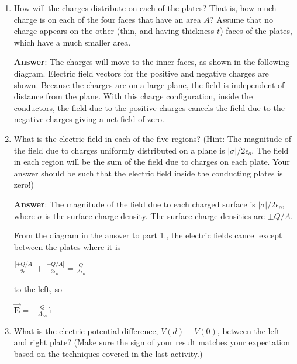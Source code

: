 \documentclass{article}
\newcommand{\ds}[0]{\displaystyle}
\newcommand{\ihat}[0]{\hat{\boldsymbol{\imath}}}
\newcommand{\bfvec}[1]{\vec{\mathbf{#1}}}
\begin{document}
\begin{enumerate}

  \item How will the charges distribute on each of the plates? That is, how much charge is on each of the four faces that have an area $A$? Assume that no charge appears on the other (thin, and having thickness $t$) faces of the plates, which have a much smaller area.

     \ifsolutions
       {\bf Answer}: The charges will move to the inner faces, as shown in the following diagram. Electric field vectors for the positive and negative charges are shown. Because the charges are on a large plane, the field is independent of distance from the plane. With this charge configuration, inside the conductors, the field due to the positive charges cancels the field due to the negative charges giving a net field of zero.

       
     \else
       \vskip 36pt
     \fi
     \ifsolutions\else
     \vskip 36pt
     \fi

  \item What is the electric field in each of the five regions? (Hint: The magnitude of the field due to charges uniformly distributed on a plane is $|\sigma|/2\epsilon_o$. The field in each region will be the sum of the field due to charges on each plate. Your answer should be such that the electric field inside the conducting plates is zero!)

     \ifsolutions
       {\bf Answer}: The magnitude of the field due to each charged surface is $|\sigma|/2\epsilon_o$, where $\sigma$ is the surface charge density. The surface charge densities are $\pm Q/A$.  

       

       From the diagram in the answer to part 1., the electric fields cancel except between the plates where it is 

       $\ds\frac{|+Q/A|}{2\epsilon_o} + \frac{|-Q/A|}{2\epsilon_o} = \frac{Q}{A\epsilon_o}$

       to the left, so

       $\ds\bfvec{E}=-\frac{Q}{A\epsilon_o}\ihat$
     \else
       \vskip 36pt
     \fi
     \ifsolutions\else
     \vskip 36pt
     \fi

  \item What is the electric potential difference, $V(d)-V(0)$, between the left and right plate? (Make sure the sign of your result matches your expectation based on the techniques covered in the last activity.)


\end{enumerate}
\end{document}
